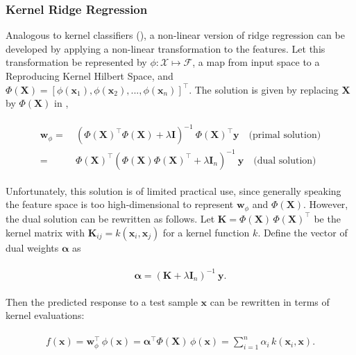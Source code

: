 \documentclass[utf8]{frontiersSCNS} %
\newcommand{\al}{\boldsymbol{\alpha}}
\newcommand{\w}{\mathbf{w}}
\newcommand{\x}{\mathbf{x}}
\newcommand{\y}{\mathbf{y}}
\newcommand{\I}{\mathbf{I}}
\newcommand{\K}{\mathbf{K}}
\newcommand{\X}{\mathbf{X}}
\begin{document}
\subsubsection{Kernel Ridge Regression}

Analogous to kernel classifiers (), a non-linear version of ridge regression can be developed by applying a non-linear transformation to the features. Let this transformation be represented by $\phi:\mathcal{X}\mapsto\mathcal{F}$, a map from input space to a Reproducing Kernel Hilbert Space, and $\Phi(\X) = [\phi(\x_1),\phi(\x_2),...,\phi(\x_n)]^\top$. The solution is given by replacing $\X$ by $\Phi(\X)$ in ,

\begin{align}
\begin{split}
\label{eq:kernel_ridge_in_feature_space}
\w_\phi =\ & (\Phi(\X)^\top\Phi(\X) + \lambda\I)^{-1}\ \Phi(\X)^\top\y \quad\text{(primal solution)}\\
 =\ & \Phi(\X)^\top (\Phi(\X)\Phi(\X)^\top + \lambda\I_n)^{-1}\ \y \quad\text{(dual solution)}
\end{split}
\end{align}

Unfortunately, this solution is of limited practical use, since generally speaking the feature space is too high-dimensional to represent $\w_\phi$ and $\Phi(\X)$. However, the dual solution can be rewritten as follows. Let $\K = \Phi(\X)\,\Phi(\X)^\top$ be the kernel matrix with $\K_{ij} = k(\x_i, \x_j)$ for a kernel function $k$. Define the vector of dual weights $\al$ as

\begin{align}
\begin{split}
\label{eq:kernel_ridge}
\al = (\K + \lambda\I_n)^{-1}\ \y.
\end{split}
\end{align}

Then the predicted response to a test sample $\x$ can be rewritten in terms of kernel evaluations:

\begin{align}
\begin{split}
\label{eq:kernel_ridge_apply}
f(\x) = \w_\phi^\top\, \phi(\x) = \al^\top\Phi(\X)\,\phi(\x) = \sum_{i=1}^n \alpha_i\, k(\x_i, \x).
\end{split}
\end{align}


\end{document}
